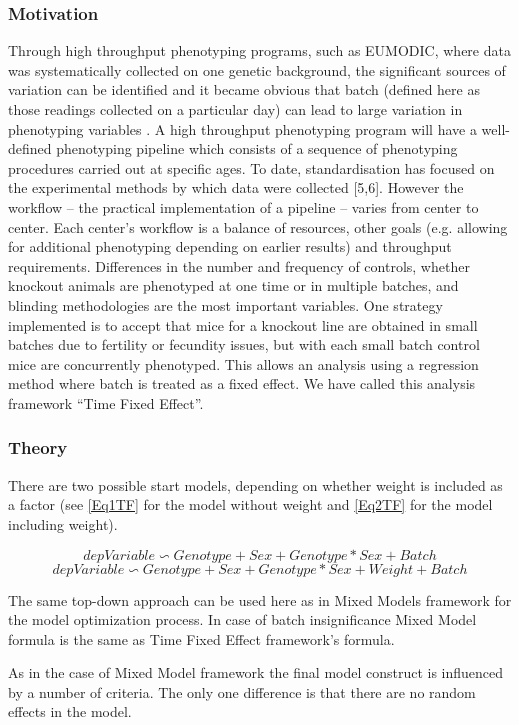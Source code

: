 \documentclass[12pt,a4paper]{article}
\begin{document}
\subsubsection{Motivation}
Through high throughput phenotyping programs, such as EUMODIC, where data was systematically collected on one genetic background, the significant sources of variation can be identified and it became obvious that batch (defined here as those readings collected on a particular day) can lead to large variation in phenotyping variables \cite{MM12}. A high throughput phenotyping program will have a well-defined phenotyping pipeline which consists of a sequence of phenotyping procedures carried out at specific ages. To date, standardisation has focused on the experimental methods by which data were collected [5,6]. However the workflow -- the practical implementation of a pipeline -- varies from center to center. Each center’s workflow is a balance of resources, other goals (e.g. allowing for additional phenotyping depending on earlier results) and throughput requirements. Differences in the number and frequency of controls, whether knockout animals are phenotyped at one time or in multiple batches, and blinding methodologies are the most important variables. One strategy implemented is to accept that mice for a knockout line are obtained in small batches due to fertility or fecundity issues, but with each small batch control mice are concurrently phenotyped. This allows an analysis using a regression method where batch is treated as a fixed effect. We have called this analysis framework “Time Fixed Effect”. 
\subsubsection{Theory}
There are two possible start models, depending on whether weight is included as a factor (see \ref{Eq1TF} for the model without weight and \ref{Eq2TF} for the model including weight).

\[
depVariable \backsim Genotype + Sex +
Genotype*Sex + Batch \tag{Eq3}\label{Eq1TF}
\]
\[
depVariable \backsim Genotype + Sex +
Genotype*Sex + Weight + Batch\tag{Eq4}\label{Eq2TF}
\]

The same top-down approach can be used here as in Mixed Models framework for the model optimization process. In case of batch insignificance Mixed Model formula is the same as Time Fixed Effect framework's formula.

As in the case of Mixed Model framework the final model construct is influenced by a number of criteria. The only one difference is that there are no random effects in the model. 
\end{document}
